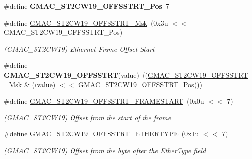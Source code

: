 \begin{DoxyCompactItemize}
\item 
\mbox{\label{group__SAMV71__GMAC_gacfc728f1299f5b7145192e01fe45a1dc}} 
\#define {\bfseries G\+M\+A\+C\+\_\+\+S\+T2\+C\+W19\+\_\+\+O\+F\+F\+S\+S\+T\+R\+T\+\_\+\+Pos}~7
\item 
\mbox{\label{group__SAMV71__GMAC_ga8bae782e134660557cbfc059f8817cf4}} 
\#define \mbox{\hyperlink{group__SAMV71__GMAC_ga8bae782e134660557cbfc059f8817cf4}{G\+M\+A\+C\+\_\+\+S\+T2\+C\+W19\+\_\+\+O\+F\+F\+S\+S\+T\+R\+T\+\_\+\+Msk}}~(0x3u $<$$<$ G\+M\+A\+C\+\_\+\+S\+T2\+C\+W19\+\_\+\+O\+F\+F\+S\+S\+T\+R\+T\+\_\+\+Pos)
\begin{DoxyCompactList}\small\item\em (G\+M\+A\+C\+\_\+\+S\+T2\+C\+W19) Ethernet Frame Offset Start \end{DoxyCompactList}\item 
\mbox{\label{group__SAMV71__GMAC_ga73fc866519ba97540fceed2fd638eae0}} 
\#define {\bfseries G\+M\+A\+C\+\_\+\+S\+T2\+C\+W19\+\_\+\+O\+F\+F\+S\+S\+T\+RT}(value)~((\mbox{\hyperlink{group__SAMV71__GMAC_ga8bae782e134660557cbfc059f8817cf4}{G\+M\+A\+C\+\_\+\+S\+T2\+C\+W19\+\_\+\+O\+F\+F\+S\+S\+T\+R\+T\+\_\+\+Msk}} \& ((value) $<$$<$ G\+M\+A\+C\+\_\+\+S\+T2\+C\+W19\+\_\+\+O\+F\+F\+S\+S\+T\+R\+T\+\_\+\+Pos)))
\item 
\mbox{\label{group__SAMV71__GMAC_ga1bcfeb7641bd8db6c40d5083b900c8c9}} 
\#define \mbox{\hyperlink{group__SAMV71__GMAC_ga1bcfeb7641bd8db6c40d5083b900c8c9}{G\+M\+A\+C\+\_\+\+S\+T2\+C\+W19\+\_\+\+O\+F\+F\+S\+S\+T\+R\+T\+\_\+\+F\+R\+A\+M\+E\+S\+T\+A\+RT}}~(0x0u $<$$<$ 7)
\begin{DoxyCompactList}\small\item\em (G\+M\+A\+C\+\_\+\+S\+T2\+C\+W19) Offset from the start of the frame \end{DoxyCompactList}\item 
\mbox{\label{group__SAMV71__GMAC_gaccdac09bbdcae7bf4d4c3be15b52c696}} 
\#define \mbox{\hyperlink{group__SAMV71__GMAC_gaccdac09bbdcae7bf4d4c3be15b52c696}{G\+M\+A\+C\+\_\+\+S\+T2\+C\+W19\+\_\+\+O\+F\+F\+S\+S\+T\+R\+T\+\_\+\+E\+T\+H\+E\+R\+T\+Y\+PE}}~(0x1u $<$$<$ 7)
\begin{DoxyCompactList}\small\item\em (G\+M\+A\+C\+\_\+\+S\+T2\+C\+W19) Offset from the byte after the Ether\+Type field \end{DoxyCompactList}\item 

\end{DoxyCompactItemize}
